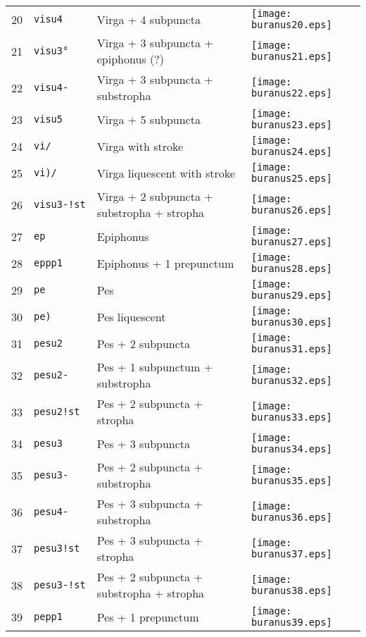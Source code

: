 \documentclass{scrarticle}
\begin{document}
\begin{longtable}{l|l|l|l}
20 & \texttt{visu4} & Virga + 4 subpuncta & \texttt{[image: buranus20.eps]} \\
21 & \texttt{visu3°} & Virga + 3 subpuncta + epiphonus (?) & \texttt{[image: buranus21.eps]} \\
22 & \texttt{visu4-} & Virga + 3 subpuncta + substropha & \texttt{[image: buranus22.eps]} \\
23 & \texttt{visu5} & Virga + 5 subpuncta & \texttt{[image: buranus23.eps]} \\
24 & \texttt{vi/} & Virga with stroke & \texttt{[image: buranus24.eps]} \\
25 & \texttt{vi)/} & Virga liquescent with stroke & \texttt{[image: buranus25.eps]} \\
26 & \texttt{visu3-!st} & Virga + 2 subpuncta + substropha + stropha & \texttt{[image: buranus26.eps]} \\
27 & \texttt{ep} & Epiphonus & \texttt{[image: buranus27.eps]} \\
28 & \texttt{eppp1} & Epiphonus + 1 prepunctum & \texttt{[image: buranus28.eps]} \\
29 & \texttt{pe} & Pes & \texttt{[image: buranus29.eps]} \\
30 & \texttt{pe)} & Pes liquescent & \texttt{[image: buranus30.eps]} \\
31 & \texttt{pesu2} & Pes + 2 subpuncta & \texttt{[image: buranus31.eps]} \\
32 & \texttt{pesu2-} & Pes + 1 subpunctum + substropha & \texttt{[image: buranus32.eps]} \\
33 & \texttt{pesu2!st} & Pes + 2 subpuncta + stropha & \texttt{[image: buranus33.eps]} \\
34 & \texttt{pesu3} & Pes + 3 subpuncta & \texttt{[image: buranus34.eps]} \\
35 & \texttt{pesu3-} & Pes + 2 subpuncta + substropha & \texttt{[image: buranus35.eps]} \\
36 & \texttt{pesu4-} & Pes + 3 subpuncta + substropha & \texttt{[image: buranus36.eps]} \\
37 & \texttt{pesu3!st} & Pes + 3 subpuncta + stropha & \texttt{[image: buranus37.eps]} \\
38 & \texttt{pesu3-!st} & Pes + 2 subpuncta + substropha + stropha & \texttt{[image: buranus38.eps]} \\
39 & \texttt{pepp1} & Pes + 1 prepunctum & \texttt{[image: buranus39.eps]} \\

\end{longtable}
\end{document}
